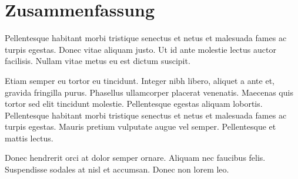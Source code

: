 \chapter*{Zusammenfassung}
Pellentesque habitant morbi tristique senectus et netus et malesuada fames ac turpis egestas. Donec vitae aliquam justo. Ut id ante molestie lectus auctor facilisis. Nullam vitae metus eu est dictum suscipit. 

Etiam semper eu tortor eu tincidunt. Integer nibh libero, aliquet a ante et, gravida fringilla purus. Phasellus ullamcorper placerat venenatis. Maecenas quis tortor sed elit tincidunt molestie. Pellentesque egestas aliquam lobortis. Pellentesque habitant morbi tristique senectus et netus et malesuada fames ac turpis egestas. Mauris pretium vulputate augue vel semper. Pellentesque et mattis lectus. 

Donec hendrerit orci at dolor semper ornare. Aliquam nec faucibus felis. Suspendisse sodales at nisl et accumsan. Donec non lorem leo. 